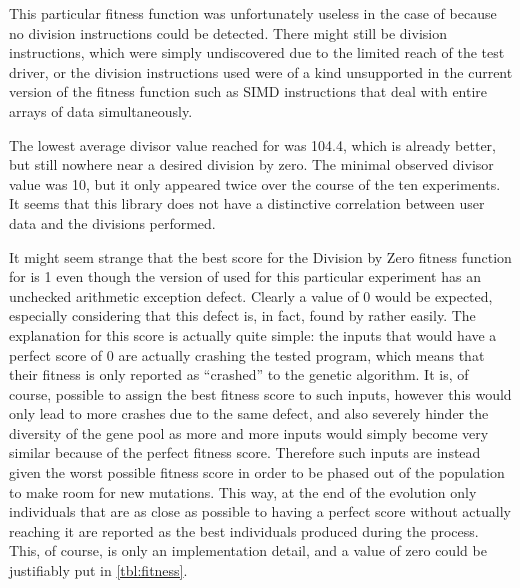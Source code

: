 This particular fitness function was unfortunately useless in the case of \libpcap because no division
instructions could be detected. There might still be division instructions, which were simply undiscovered due
to the limited reach of the test driver, or the division instructions used were of a kind unsupported in the
current version of the fitness function such as SIMD instructions that deal with entire arrays of data
simultaneously.

The lowest average divisor value reached for \libxml was 104.4, which is already better, but still nowhere near
a desired division by zero. The minimal observed divisor value was 10, but it only appeared twice over the
course of the ten experiments. It seems that this library does not have a distinctive correlation between user
data and the divisions performed.

It might seem strange that the best score for the Division by Zero fitness function for \libpng is 1 even
though the version of \libpng used for this particular experiment has an unchecked arithmetic exception
defect. Clearly a value of 0 would be expected, especially considering that this defect is, in
fact, found by \xmlmate rather easily. The explanation for this score is actually quite simple: the inputs
that would have a perfect score of 0 are actually crashing the tested program, which means that their
fitness is only reported as ``crashed'' to the genetic algorithm. It is, of course, possible to assign
the best fitness score to such inputs, however this would only lead to more crashes due to the same
defect, and also severely hinder the diversity of the gene pool as more and more inputs would simply become
very similar because of the perfect fitness score. Therefore such inputs are instead given the worst possible
fitness score in order to be phased out of the population to make room for new mutations. This way, at the end
of the evolution only individuals that are as close as possible to having a perfect score without actually
reaching it are reported as the best individuals produced during the process. This, of course, is only an
implementation detail, and a value of zero could be justifiably put in \cref{tbl:fitness}.

